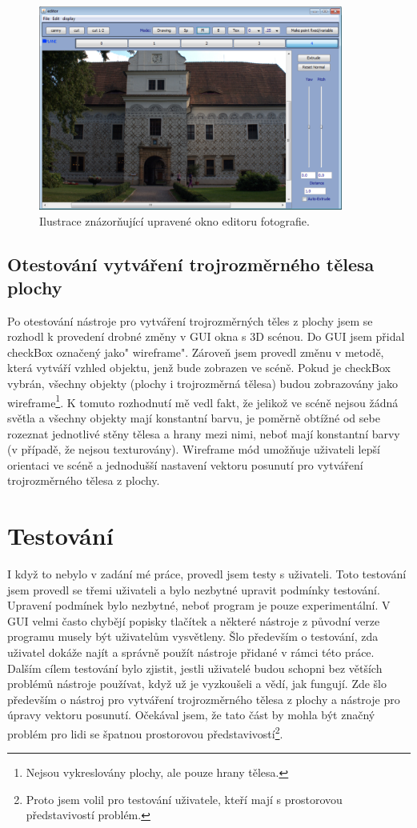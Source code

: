 \documentclass[11pt,twoside,a4paper]{book}
\begin{document}
\begin{figure}[h]
	\begin{center}
		\includegraphics[width=10cm]{ilustrace/Il-5-1}
		\caption{Ilustrace znázorňující upravené okno editoru fotografie.}
		\label{fig:5-1}
	\end{center}
\end{figure}

\subsection{Otestování vytváření trojrozměrného tělesa plochy}
Po otestování nástroje pro vytváření trojrozměrných těles z plochy jsem se rozhodl k provedení drobné změny v GUI okna s 3D scénou. Do GUI jsem přidal checkBox označený jako" wireframe". Zároveň jsem provedl změnu v metodě, která vytváří vzhled objektu, jenž bude zobrazen ve scéně. Pokud je checkBox vybrán, všechny objekty (plochy i trojrozměrná tělesa) budou zobrazovány jako wireframe\footnote{Nejsou vykreslovány plochy, ale pouze hrany tělesa.}. K tomuto rozhodnutí mě vedl fakt, že jelikož ve scéně nejsou žádná světla a všechny objekty mají konstantní barvu, je poměrně obtížné od sebe rozeznat jednotlivé stěny tělesa a hrany mezi nimi, neboť mají konstantní barvy (v případě, že nejsou texturovány). Wireframe mód umožňuje uživateli lepší orientaci ve scéně a jednodušší nastavení vektoru posunutí pro vytváření trojrozměrného tělesa z plochy.

\section{Testování}
I když to nebylo v zadání mé práce, provedl jsem testy s uživateli. Toto testování jsem provedl se třemi uživateli a bylo nezbytné upravit podmínky testování. Upravení podmínek bylo nezbytné, neboť program je pouze experimentální. V GUI velmi často chybějí popisky tlačítek a některé nástroje z původní verze programu musely být uživatelům vysvětleny. Šlo především o testování, zda uživatel dokáže najít a správně použít nástroje přidané v rámci této práce. Dalším cílem testování bylo zjistit, jestli uživatelé budou schopni bez větších problémů nástroje používat, když už je vyzkoušeli a vědí, jak fungují. Zde šlo především o nástroj pro vytváření trojrozměrného tělesa z plochy a nástroje pro úpravy vektoru posunutí. Očekával jsem, že tato část by mohla být značný problém pro lidi se špatnou prostorovou představivostí\footnote{Proto jsem volil pro testování uživatele, kteří mají s prostorovou představivostí problém.}. 
\end{document}
